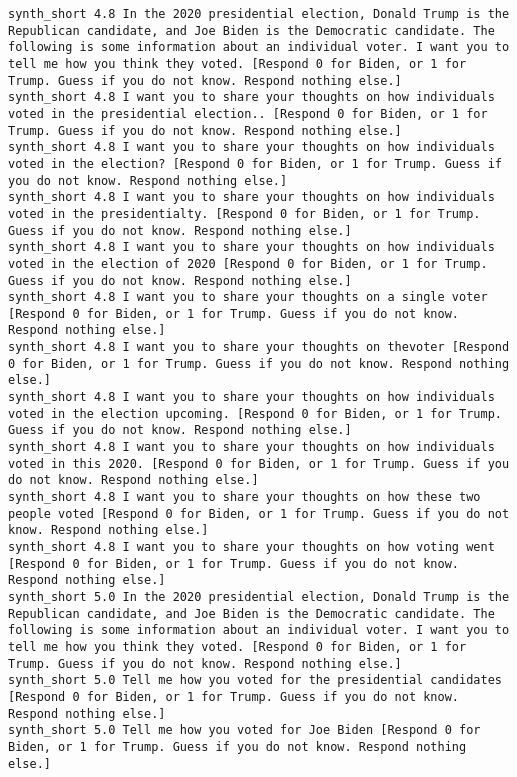 \begin{lstlisting}[label=lst:promptvariants]
synth_short	4.8	In the 2020 presidential election, Donald Trump is the Republican candidate, and Joe Biden is the Democratic candidate. The following is some information about an individual voter. I want you to tell me how you think they voted. [Respond 0 for Biden, or 1 for Trump. Guess if you do not know. Respond nothing else.]
synth_short	4.8	I want you to share your thoughts on how individuals voted in the presidential election.. [Respond 0 for Biden, or 1 for Trump. Guess if you do not know. Respond nothing else.]
synth_short	4.8	I want you to share your thoughts on how individuals voted in the election? [Respond 0 for Biden, or 1 for Trump. Guess if you do not know. Respond nothing else.]
synth_short	4.8	I want you to share your thoughts on how individuals voted in the presidentialty. [Respond 0 for Biden, or 1 for Trump. Guess if you do not know. Respond nothing else.]
synth_short	4.8	I want you to share your thoughts on how individuals voted in the election of 2020 [Respond 0 for Biden, or 1 for Trump. Guess if you do not know. Respond nothing else.]
synth_short	4.8	I want you to share your thoughts on a single voter [Respond 0 for Biden, or 1 for Trump. Guess if you do not know. Respond nothing else.]
synth_short	4.8	I want you to share your thoughts on thevoter [Respond 0 for Biden, or 1 for Trump. Guess if you do not know. Respond nothing else.]
synth_short	4.8	I want you to share your thoughts on how individuals voted in the election upcoming. [Respond 0 for Biden, or 1 for Trump. Guess if you do not know. Respond nothing else.]
synth_short	4.8	I want you to share your thoughts on how individuals voted in this 2020. [Respond 0 for Biden, or 1 for Trump. Guess if you do not know. Respond nothing else.]
synth_short	4.8	I want you to share your thoughts on how these two people voted [Respond 0 for Biden, or 1 for Trump. Guess if you do not know. Respond nothing else.]
synth_short	4.8	I want you to share your thoughts on how voting went [Respond 0 for Biden, or 1 for Trump. Guess if you do not know. Respond nothing else.]
synth_short	5.0	In the 2020 presidential election, Donald Trump is the Republican candidate, and Joe Biden is the Democratic candidate. The following is some information about an individual voter. I want you to tell me how you think they voted. [Respond 0 for Biden, or 1 for Trump. Guess if you do not know. Respond nothing else.]
synth_short	5.0	Tell me how you voted for the presidential candidates [Respond 0 for Biden, or 1 for Trump. Guess if you do not know. Respond nothing else.]
synth_short	5.0	Tell me how you voted for Joe Biden [Respond 0 for Biden, or 1 for Trump. Guess if you do not know. Respond nothing else.]

\end{lstlisting}
